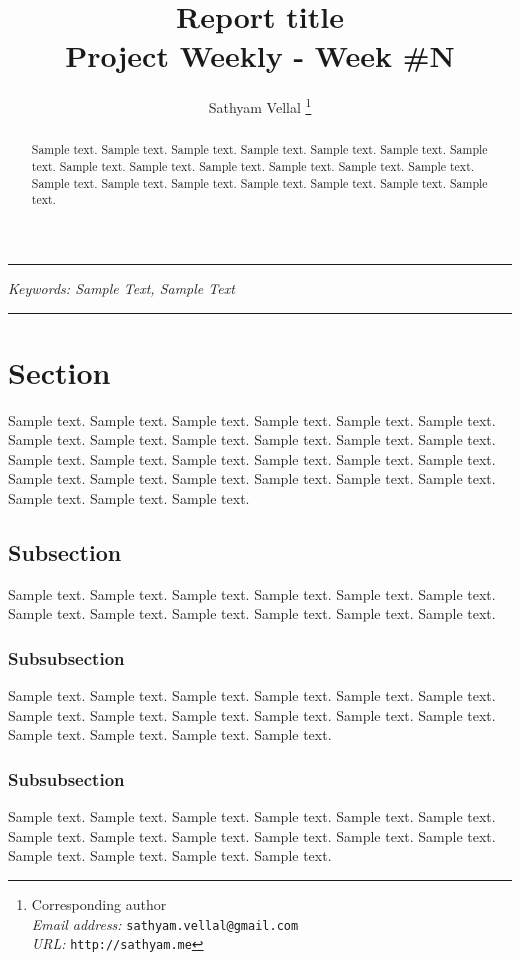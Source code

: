 \documentclass[12pt]{article}
\title{Report title \\ {\normalsize Project Weekly - Week \#N}}
\author[1]{Sathyam Vellal 
	\thanks{Corresponding author\\
		\indent\hspace{2.5mm}\textit{Email address:} \texttt{sathyam.vellal@gmail.com}\\
		\indent\hspace{2.5mm}\textit{URL:} \texttt{http://sathyam.me}
	}
}
\affil[1]{\normalsize Los Angeles, CA, 90007}
\date{}
\begin{document}
\vspace{-2em}
\maketitle
\thispagestyle{fancyfirst}

\vspace{-2em}
\hrule
\begin{abstract}
\noindent Sample text. Sample text. Sample text. Sample text. Sample text. Sample text. Sample text. Sample text. Sample text. Sample text. Sample text. Sample text. Sample text. Sample text. Sample text. Sample text. Sample text. Sample text. Sample text. Sample text.
\end{abstract}
{\small\itshape Keywords: Sample Text, Sample Text}
\hfill\\
\hrule

\section{Section}
\label{sec-section}
Sample text. Sample text. Sample text. Sample text. Sample text. Sample text. Sample text. Sample text. Sample text. Sample text. Sample text. Sample text. Sample text. Sample text. Sample text. Sample text. Sample text. Sample text. Sample text. Sample text. Sample text. Sample text. Sample text. Sample text. Sample text. Sample text. Sample text.

\subsection{Subsection}
Sample text. Sample text. Sample text. Sample text. Sample text. Sample text. Sample text. Sample text. Sample text. Sample text. Sample text. Sample text.

\subsubsection{Subsubsection}
Sample text. Sample text. Sample text. Sample text. Sample text. Sample text. Sample text. Sample text. Sample text. Sample text. Sample text. Sample text. Sample text. Sample text. Sample text. Sample text.
\subsubsection{Subsubsection}
Sample text. Sample text. Sample text. Sample text. Sample text. Sample text. Sample text. Sample text. Sample text. Sample text. Sample text. Sample text. Sample text. Sample text. Sample text. Sample text.
 
\nocite{*}


\end{document}
